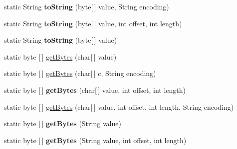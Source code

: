 \begin{DoxyCompactItemize}
static String {\bfseries to\+String} (byte\mbox{[}$\,$\mbox{]} value, String encoding)
\item 
\mbox{\label{classcom_1_1mysql_1_1cj_1_1util_1_1_string_utils_a527b0246e4a34b2c2bd93a589dc36dee}} 
static String {\bfseries to\+String} (byte\mbox{[}$\,$\mbox{]} value, int offset, int length)
\item 
\mbox{\label{classcom_1_1mysql_1_1cj_1_1util_1_1_string_utils_aa770678b56757ab1c7a91ffe523dcd7e}} 
static String {\bfseries to\+String} (byte\mbox{[}$\,$\mbox{]} value)
\item 
static byte \mbox{[}$\,$\mbox{]} \mbox{\hyperlink{classcom_1_1mysql_1_1cj_1_1util_1_1_string_utils_a8511f19038629bb79919340b70bf263b}{get\+Bytes}} (char\mbox{[}$\,$\mbox{]} value)
\item 
static byte \mbox{[}$\,$\mbox{]} \mbox{\hyperlink{classcom_1_1mysql_1_1cj_1_1util_1_1_string_utils_a8967b073f47b3abc09e87db0874b5be9}{get\+Bytes}} (char\mbox{[}$\,$\mbox{]} c, String encoding)
\item 
\mbox{\label{classcom_1_1mysql_1_1cj_1_1util_1_1_string_utils_aac95e17a8ab0cd549b796ca78408a1ca}} 
static byte \mbox{[}$\,$\mbox{]} {\bfseries get\+Bytes} (char\mbox{[}$\,$\mbox{]} value, int offset, int length)
\item 
static byte \mbox{[}$\,$\mbox{]} \mbox{\hyperlink{classcom_1_1mysql_1_1cj_1_1util_1_1_string_utils_a422b1cae6a464bf3f1e7047bdf4ad2e5}{get\+Bytes}} (char\mbox{[}$\,$\mbox{]} value, int offset, int length, String encoding)
\item 
\mbox{\label{classcom_1_1mysql_1_1cj_1_1util_1_1_string_utils_a2604a7b8b0c172222607ae600fa01701}} 
static byte \mbox{[}$\,$\mbox{]} {\bfseries get\+Bytes} (String value)
\item 
\mbox{\label{classcom_1_1mysql_1_1cj_1_1util_1_1_string_utils_ac410c21fd9bb1b197c87dae236a62d68}} 
static byte \mbox{[}$\,$\mbox{]} {\bfseries get\+Bytes} (String value, int offset, int length)
\item 
\mbox{\label{classcom_1_1mysql_1_1cj_1_1util_1_1_string_utils_a320c6cc47f6666d72e62e9e165d9e1f1}} 

\end{DoxyCompactItemize}
